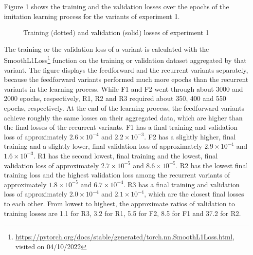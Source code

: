 Figure \ref{fig:e1_learn} shows the 
training and the validation losses
over the epochs of the imitation learning process 
for the variants of experiment 1.
\begin{figure}
    \centering
    \hspace*{0cm}
    \par
    \caption[
        Training and validation losses of experiment 1
    ]{
        Training (dotted) and validation (solid) losses of experiment 1
        \label{fig:e1_learn}
    }
\end{figure}
The training or the validation loss of a variant is calculated with the SmoothL1Loss\footnote{
    \url{https://pytorch.org/docs/stable/generated/torch.nn.SmoothL1Loss.html}, visited on 04/10/2022
}
function on the training or validation dataset aggregated by that variant.
The figure displays the feedforward and the recurrent variants separately,
because the feedforward variants performed much more epochs than the recurrent variants in the learning process.
While F1 and F2 went through about 3000 and 2000 epochs, respectively,
R1, R2 and R3 required about 350, 400 and 550 epochs, respectively.
At the end of the learning process,
the feedforward variants achieve roughly the same losses on their aggregated data,
which are higher than the final losses of the recurrent variants.
F1 has a final training and validation loss of 
approximately $2.6\times 10^{-4}$ and $2.2\times 10^{-3}$.
F2 has a slightly higher, final training and a slightly lower, final validation loss of approximately
$2.9\times 10^{-4}$ and $1.6\times 10^{-3}$.
R1 has the second lowest, final training and the lowest, final validation
loss of approximately $2.7\times 10^{-5}$ and $8.6\times 10^{-5}$.
R2 has the lowest final training loss and 
the highest validation loss among the recurrent variants 
of approximately $1.8\times 10^{-5}$ and $6.7\times 10^{-4}$.
R3 has a final training and validation loss of approximately $2.0\times 10^{-4}$ and $2.1\times 10^{-4}$,
which are the closest final losses to each other.
From lowest to highest,
the approximate ratios of validation to training losses are 
1.1 for R3,
3.2 for R1,
5.5 for F2,
8.5 for F1 
and 37.2 for R2.



